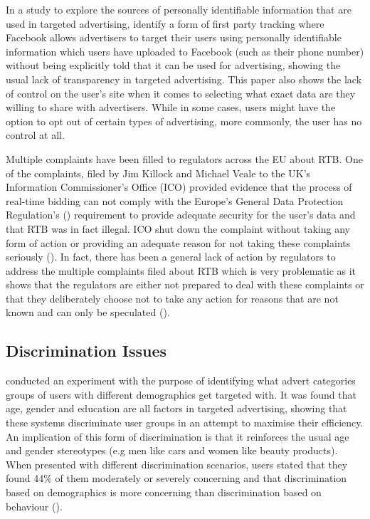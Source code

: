 \documentclass{l4proj}
\begin{document}
In a study to explore the sources of personally identifiable information that are used in targeted advertising, \cite{Venkatadri2019} identify a form of first party tracking where Facebook allows advertisers to target their users using personally identifiable information which users have uploaded to Facebook (such as their phone number) without being explicitly told that it can be used for advertising, showing the usual lack of transparency in targeted advertising. This paper also shows the lack of control on the user's site when it comes to selecting what exact data are they willing to share with advertisers. While in some cases, users might have the option to opt out of certain types of advertising, more commonly, the user has no control at all.

Multiple complaints have been filled to regulators across the EU about RTB. One of the complaints, filed by Jim Killock and Michael Veale to the UK's Information Commissioner's Office (ICO) provided evidence that the process of real-time bidding can not comply with the Europe’s General Data Protection Regulation's (\cite{gdpr}) requirement to provide adequate security for the user's data and that RTB was in fact illegal. ICO shut down the complaint without taking any form of action or providing an adequate reason for not taking these complaints seriously (\cite{rtbcomplaint}). In fact, there has been a general lack of action by regulators to address the multiple complaints filed about RTB which is very problematic as it shows that the regulators are either not prepared to deal with these complaints or that they deliberately choose not to take any action for reasons that are not known and can only be speculated (\cite{report}).

\subsection{Discrimination Issues}
\cite{Bol2019a} conducted an experiment with the purpose of identifying what advert categories groups of users with different demographics get targeted with. It was found that age, gender and education are all factors in targeted advertising, showing that these systems discriminate user groups in an attempt to maximise their efficiency. An implication of this form of discrimination is that it reinforces the usual age and gender stereotypes (e.g men like cars and women like beauty products). When presented with different discrimination scenarios, users stated that they found 44\% of them moderately or severely concerning and that discrimination based on demographics is more concerning than discrimination based on behaviour (\cite{Plane2017}).
\end{document}
